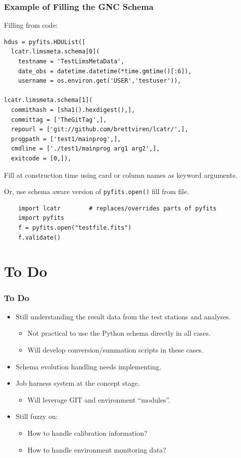\documentclass[xcolor=dvipsnames]{beamer}
\begin{document}
\begin{frame}[fragile]
  \frametitle{Example of Filling the GNC Schema}
  
  Filling from code:
  \begin{lstlisting}
hdus = pyfits.HDUList([
  lcatr.limsmeta.schema[0](
    testname = 'TestLimsMetaData',
    date_obs = datetime.datetime(*time.gmtime()[:6]),
    username = os.environ.get('USER','testuser')),

lcatr.limsmeta.schema[1](
  commithash = [sha1().hexdigest(),],
  committag = ['TheGitTag',],
  repourl = ['git://github.com/brettviren/lcatr/',],
  progpath = ['test1/mainprog',],
  cmdline = ['./test1/mainprog arg1 arg2',],
  exitcode = [0,]),
  \end{lstlisting}

  Fill at construction time using card or column names as keyword arguments.

  \vspace{3mm}

  Or, use schema aware version of \texttt{pyfits.open()} fill from file.

  \begin{lstlisting}
    import lcatr        # replaces/overrides parts of pyfits
    import pyfits
    f = pyfits.open("testfile.fits")
    f.validate()
  \end{lstlisting}
\end{frame}

\section{To Do}

\begin{frame}
  \frametitle{To Do}
  \begin{itemize}
  \item Still understanding the result data from the test stations and analyses.
    \begin{itemize}
    \item Not practical to use the Python schema directly in all cases.
    \item Will develop conversion/summation scripts in these cases.
    \end{itemize}
  \item Schema evolution handling needs implementing.
  \item Job harness system at the concept stage.
    \begin{itemize}
    \item Will leverage GIT and environment ``modules''.
    \end{itemize}
  \item Still fuzzy on:
    \begin{itemize}
    \item How to handle calibration information?
    \item How to handle environment monitoring data?
    \end{itemize}
  \end{itemize}
\end{frame}
\end{document}

